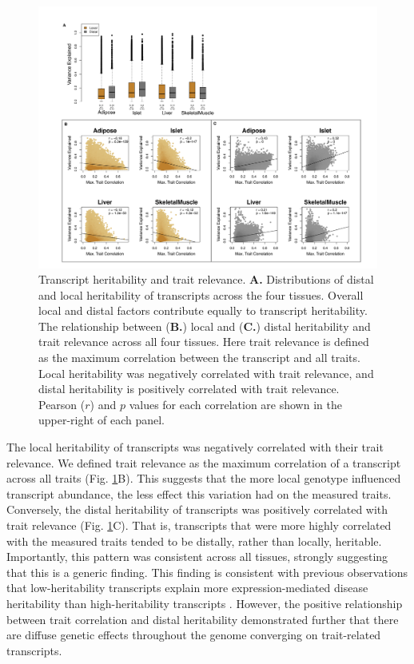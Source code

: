 \documentclass[
]{article}
\begin{document}
\begin{figure}[ht!]
\includegraphics[width=\textwidth]{Figures/Fig2_motivation.pdf} 
\caption{Transcript heritability and trait relevance. 
\textbf{A.} Distributions of distal and local heritability of 
transcripts across the four tissues. Overall local and distal 
factors contribute equally to transcript heritability. The 
relationship between (\textbf{B.}) local and (\textbf{C.}) 
distal heritability and trait relevance across all four tissues. 
Here trait relevance is defined as the maximum correlation between 
the transcript and all traits. Local heritability was negatively 
correlated with trait relevance, and distal heritability is 
positively correlated with trait relevance. Pearson ($r$) and $p$ 
values for each correlation are shown in the upper-right of each panel.}
\label{fig:motivation}
\end{figure}

The local heritability of transcripts was negatively correlated with
their trait relevance. We defined trait relevance as the maximum
correlation of a transcript across all traits (Fig.
\ref{fig:motivation}B). This suggests that the more local genotype
influenced transcript abundance, the less effect this variation had on
the measured traits. Conversely, the distal heritability of transcripts
was positively correlated with trait relevance (Fig.
\ref{fig:motivation}C). That is, transcripts that were more highly
correlated with the measured traits tended to be distally, rather than
locally, heritable. Importantly, this pattern was consistent across all
tissues, strongly suggesting that this is a generic finding. This
finding is consistent with previous observations that low-heritability
transcripts explain more expression-mediated disease heritability than
high-heritability transcripts \cite{pmid32424349}. However, the positive
relationship between trait correlation and distal heritability
demonstrated further that there are diffuse genetic effects throughout
the genome converging on trait-related transcripts.
\end{document}
